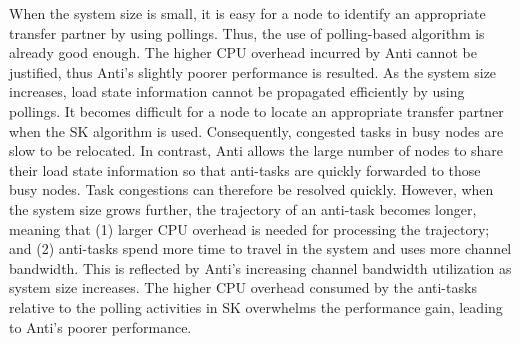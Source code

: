 When the system size is small, it is easy for a node to identify 
an appropriate transfer partner by using pollings. 
Thus, the use of polling-based algorithm is already good enough.
The higher CPU overhead incurred by {\sc Anti} cannot be justified,
thus {\sc Anti}'s slightly poorer performance is resulted.
%
As the system size increases, load state information cannot be propagated
efficiently by using pollings.
It becomes difficult for a node to locate an appropriate transfer partner
when the {\sc SK} algorithm is used.
Consequently, congested tasks in busy nodes are slow to be relocated. 
In contrast, {\sc Anti} allows the large number of nodes to share 
their load state information so that anti-tasks are quickly forwarded 
to those busy nodes. Task congestions can therefore be resolved quickly.
%
However, when the system size grows further, 
the trajectory of an anti-task becomes longer, meaning that
(1) larger CPU overhead is needed for processing the trajectory; and
(2) anti-tasks spend more time to travel in the system 
and uses more channel bandwidth.
This is reflected by {\sc Anti}'s increasing channel bandwidth utilization as
system size increases.
%
The higher CPU overhead consumed by the anti-tasks relative to the polling 
activities in {\sc SK} overwhelms the performance gain, leading to {\sc Anti}'s 
poorer performance.


\chapterend
